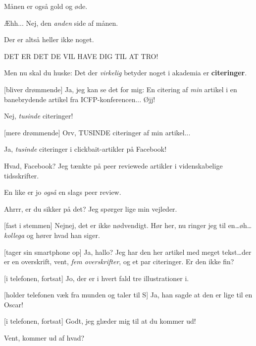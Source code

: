 \documentclass[a4paper,11pt]{article}
\begin{document}
\begin{sketch}
 Månen er også gold og øde.

 Æhh...  Nej, den \emph{anden} side af månen.

 Der er altså heller ikke noget.

 DET ER DET DE VIL HAVE DIG TIL AT TRO!



 Men nu skal du huske: Det der \emph{virkelig} betyder noget i akademia
er \textbf{citeringer}.

[bliver drømmende] Ja, jeg kan se det for mig: En citering af \emph{min}
artikel i en banebrydende artikel fra ICFP-konferencen...  Øjj!

 Nej, \emph{tusinde} citeringer!

[mere drømmende] Orv, TUSINDE citeringer af min artikel...

 Ja, \emph{tusinde} citeringer i clickbait-artikler på Facebook!

 Hvad, Facebook?  Jeg tænkte på peer reviewede artikler i videnskabelige
tidsskrifter.

 En like er jo \emph{også} en slags peer review.

 Ahrrr, er du sikker på det?  Jeg spørger lige min vejleder.

[fast i stemmen] Nejnej, det er ikke nødvendigt.   Hør
her, nu ringer jeg til en\ldots øh\ldots \emph{kollega} og hører hvad han
siger.

[tager sin smartphone op] Ja, hallo?  Jeg har den her artikel med meget
tekst\ldots der er en overskrift, vent,  \emph{fem overskrifter},
og et par citeringer.  Er den ikke fin?


[i telefonen, fortsat] Jo, der er i hvert fald tre illustrationer i.

[holder telefonen væk fra munden og taler til S] Ja, han sagde at den er
lige til en Oscar!


[i telefonen, fortsat] Godt, jeg glæder mig til at du kommer ud!

 Vent, kommer ud af hvad?


\end{sketch}
\end{document}
